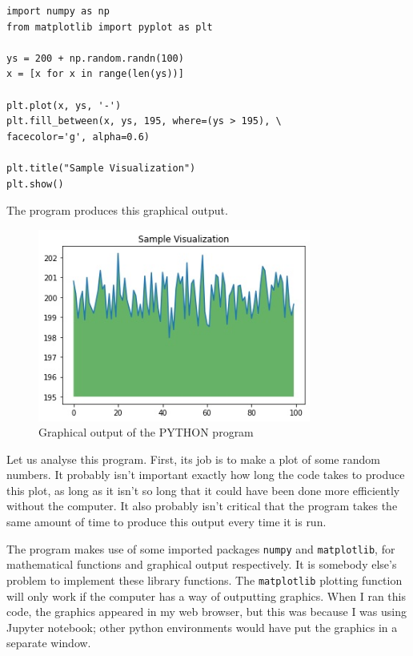 \documentclass[../physical_computing.tex]{subfiles}
\begin{document}
\begin{verbatim}
import numpy as np
from matplotlib import pyplot as plt

ys = 200 + np.random.randn(100)
x = [x for x in range(len(ys))]

plt.plot(x, ys, '-')
plt.fill_between(x, ys, 195, where=(ys > 195), \
facecolor='g', alpha=0.6)

plt.title("Sample Visualization")
plt.show()
\end{verbatim}
The program produces this graphical output.
\begin{figure}[h!]
    \centering
    \includegraphics[width=0.8\textwidth]{chapter_1/figures/pythongraph.jpg}
    \caption{Graphical output of the PYTHON program}
    \label{fig:pythongraph}
\end{figure}

Let us analyse this program. First, its job is to make a plot of some random numbers. It probably isn't important exactly how long the code takes to produce this plot, as long as it isn't so long that it could have been done more efficiently without the computer. It also probably isn't critical that the program takes the same amount of time to produce this output every time it is run. 

The program makes use of some imported packages \texttt{numpy} and \texttt{matplotlib}, for mathematical functions and graphical output respectively.
It is somebody else's problem to implement these library functions. The \texttt{matplotlib} plotting function will only work if the computer has a way of outputting graphics. When I ran this code, the graphics appeared in my web browser, but this was because I was using Jupyter notebook; other python environments would have put the graphics in a separate window. 
\end{document}
